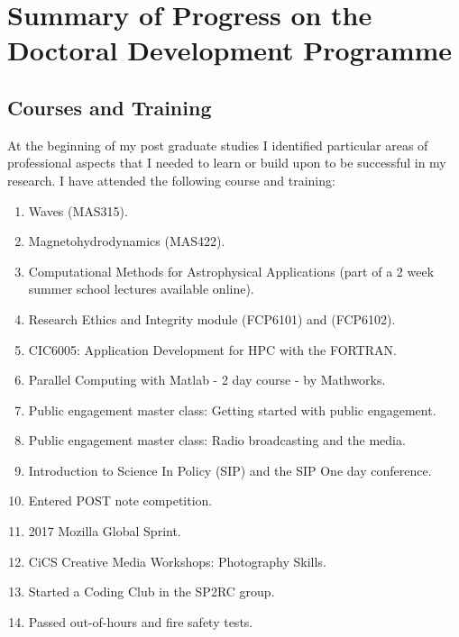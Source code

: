 \documentclass[12pt,a4paper,twoside]{article}
\begin{document}
\section{Summary of Progress on the Doctoral Development Programme}
\subsection{Courses and Training}
At the beginning of my post graduate studies I identified particular areas of professional aspects that I needed to learn or build upon to be successful in my research. I have attended the following course and training:
\begin{enumerate}
\item Waves (MAS315).\label{1}
\item Magnetohydrodynamics (MAS422). \label{2}
\item Computational Methods for Astrophysical Applications (part of a 2 week summer school lectures available online). \label{3}
\item Research Ethics and Integrity module (FCP6101) and (FCP6102).\label{3.5}
\item CIC6005: Application Development for HPC with the FORTRAN. \label{4}
\item Parallel Computing with Matlab - 2 day course - by Mathworks. \label{5}
\item Public engagement master class: Getting started with public engagement. \label{6}
\item Public engagement master class: Radio broadcasting and the media. \label{7}
\item Introduction to Science In Policy (SIP) and the SIP One day conference. \label{8}
\item Entered POST note competition. \label{9}
\item 2017 Mozilla Global Sprint.\label{10}
\item CiCS Creative Media Workshops: Photography Skills. \label{12}
\item Started a Coding Club in the SP2RC group. \label{11}
\item Passed out-of-hours and fire safety tests.
\end{enumerate}
\end{document}

